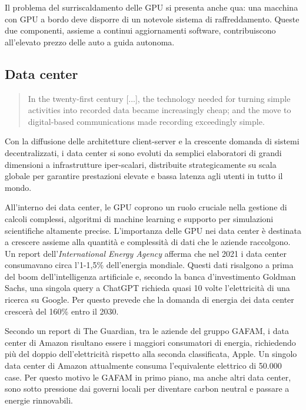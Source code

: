 \documentclass[12pt,a4paper,oneside]{book}
\begin{document}
Il problema del surriscaldamento delle GPU si presenta anche qua: una macchina con GPU a bordo deve disporre di un notevole sistema di raffreddamento. Queste due componenti, assieme a continui aggiornamenti software, contribuiscono all'elevato prezzo delle auto a guida autonoma.

\subsection{Data center}

\begin{quote}
\small
In the twenty-first century [...], the technology needed for turning simple activities into recorded data became increasingly cheap; and the move to digital-based communications made recording exceedingly simple.\citep[p.28]{srnicek2017platform}
\end{quote}

Con la diffusione delle architetture client-server e la crescente domanda di sistemi decentralizzati, i data center si sono evoluti da semplici elaboratori di grandi dimensioni a infrastrutture iper-scalari, distribuite strategicamente su scala globale per garantire prestazioni elevate e bassa latenza agli utenti in tutto il mondo.

All'interno dei data center, le GPU coprono un ruolo cruciale nella gestione di calcoli complessi, algoritmi di machine learning e supporto per simulazioni scientifiche altamente precise. L'importanza delle GPU nei data center è destinata a crescere assieme alla quantità e complessità di dati che le aziende raccolgono. Un report dell'\textit{International Energy Agency} afferma che nel 2021 i data center consumavano circa l'1-1,5\% dell'energia mondiale. Questi dati risalgono a prima del boom dell'intelligenza artificiale e, secondo la banca d'investimento Goldman Sachs, una singola query a ChatGPT richieda quasi 10 volte l'elettricità di una ricerca su Google. Per questo prevede che la domanda di energia dei data center crescerà del 160\% entro il 2030.

Secondo un report di The Guardian\cite{guardian2024datacenters}, tra le aziende del gruppo GAFAM, i data center di Amazon risultano essere i maggiori consumatori di energia, richiedendo più del doppio dell'elettricità rispetto alla seconda classificata, Apple. Un singolo data center di Amazon attualmente consuma l'equivalente elettrico di 50.000 case. Per questo motivo le GAFAM in primo piano, ma anche altri data center, sono sotto pressione dai governi locali per diventare carbon neutral e passare a energie rinnovabili.
\end{document}
